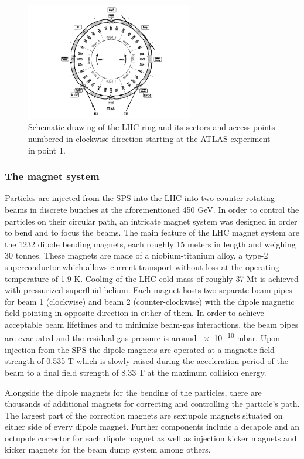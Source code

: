 \begin{figure}[h!]
    \centering
    \includegraphics[width=0.65\textwidth]{../figs/lhc_scheme.pdf}
    \caption{Schematic drawing of the LHC ring and its sectors and access points numbered in clockwise direction
    starting at the ATLAS experiment in point 1.}
    \label{fig:lhc_scheme}
\end{figure}


\subsubsection*{The magnet system}
Particles are injected from the SPS into the LHC into two counter-rotating beams in discrete bunches
at the aforementioned 450 GeV. In order to control the particles on their circular path, an intricate magnet 
system was designed in order to bend and to focus the beams. The main feature of the LHC magnet system are
the 1232 dipole bending magnets, each roughly 15 meters in length and weighing 30 tonnes. These magnets
are made of a niobium-titanium alloy, a type-2 superconductor which allows current transport without loss
at the operating temperature of 1.9 K. Cooling of the LHC cold mass of roughly 37 Mt is achieved with pressurized superfluid helium. 
Each magnet hosts two separate beam-pipes for beam 1 (clockwise) and beam
2 (counter-clockwise) with the dipole magnetic field pointing in opposite direction in either of them. In order to achieve
acceptable beam lifetimes and to minimize beam-gas interactions, the beam pipes are evacuated and the residual gas
pressure is around \num{e-10} mbar.
Upon injection from the SPS the dipole magnets are operated at a magnetic field strength of 0.535 T which is slowly
raised during the acceleration period of the beam to a final field strength of 8.33 T at the maximum collision
energy.

Alongside the dipole magnets for the bending of the particles, there are thousands of additional magnets for correcting
and controlling the particle's path. The largest part of the correction magnets are sextupole magnets situated
on either side of every dipole magnet. Further components include a decapole and an octupole corrector for
each dipole magnet as well as injection kicker magnets and kicker magnets for the beam dump system among others.


